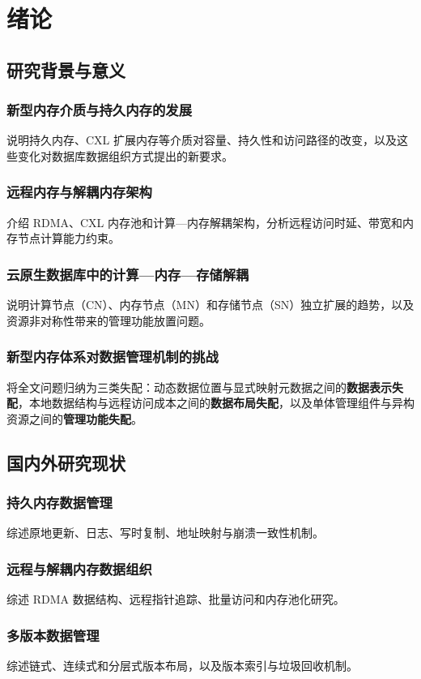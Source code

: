 \chapter{绪论}

\section{研究背景与意义}
\subsection{新型内存介质与持久内存的发展}
说明持久内存、CXL 扩展内存等介质对容量、持久性和访问路径的改变，以及这些变化对数据库数据组织方式提出的新要求。
\subsection{远程内存与解耦内存架构}
介绍 RDMA、CXL 内存池和计算—内存解耦架构，分析远程访问时延、带宽和内存节点计算能力约束。
\subsection{云原生数据库中的计算—内存—存储解耦}
说明计算节点（CN）、内存节点（MN）和存储节点（SN）独立扩展的趋势，以及资源非对称性带来的管理功能放置问题。
\subsection{新型内存体系对数据管理机制的挑战}
将全文问题归纳为三类失配：动态数据位置与显式映射元数据之间的\textbf{数据表示失配}，本地数据结构与远程访问成本之间的\textbf{数据布局失配}，以及单体管理组件与异构资源之间的\textbf{管理功能失配}。

\section{国内外研究现状}
\subsection{持久内存数据管理}
综述原地更新、日志、写时复制、地址映射与崩溃一致性机制。
\subsection{远程与解耦内存数据组织}
综述 RDMA 数据结构、远程指针追踪、批量访问和内存池化研究。
\subsection{多版本数据管理}
综述链式、连续式和分层式版本布局，以及版本索引与垃圾回收机制。
